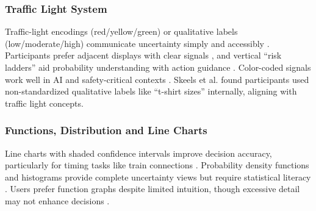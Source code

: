 \documentclass[final,journal,a4paper]{IEEEtran}
\begin{document}
\subsubsection{Traffic Light System}
Traffic-light encodings (red/yellow/green) or qualitative labels (low/moderate/high) communicate uncertainty simply and accessibly \cite{Potter2012, Skeels2008, Clive2023}. Participants prefer adjacent displays with clear signals \cite{Potter2012}, and vertical ``risk ladders'' aid probability understanding with action guidance \cite{Lipkus1999}. Color-coded signals work well in AI and safety-critical contexts \cite{Dong2024, Yu2025}. Skeels et al. \cite{Skeels2008} found participants used non-standardized qualitative labels like ``t-shirt sizes'' internally, aligning with traffic light concepts.

\subsubsection{Functions, Distribution and Line Charts}
Line charts with shaded confidence intervals improve decision accuracy, particularly for timing tasks like train connections \cite{Koval2022}. Probability density functions and histograms provide complete uncertainty views but require statistical literacy \cite{Greis2015, Belia2005}. Users prefer function graphs despite limited intuition, though excessive detail may not enhance decisions \cite{Greis2015}.
\end{document}
